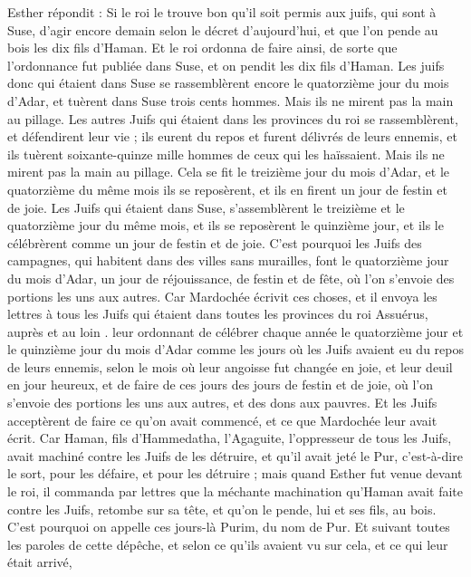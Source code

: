 \begin{multicols}{2}
Esther répondit : Si le roi le trouve bon qu'il soit permis aux juifs, qui sont à Suse, d’agir encore demain selon le décret d’aujourd'hui, et que l'on pende au bois les dix fils d'Haman.
Et le roi ordonna de faire ainsi, de sorte que l’ordonnance fut publiée dans Suse, et on pendit les dix fils d'Haman.
Les juifs donc qui étaient dans Suse se rassemblèrent encore le quatorzième jour du mois d'Adar, et tuèrent dans Suse trois cents hommes. Mais ils ne mirent pas la main au pillage.
Les autres Juifs qui étaient dans les provinces du roi se rassemblèrent, et défendirent leur vie ; ils eurent du repos et furent délivrés de leurs ennemis, et ils tuèrent soixante-quinze mille hommes de ceux qui les haïssaient. Mais ils ne mirent pas la main au pillage.
Cela se fit le treizième jour du mois d'Adar, et le quatorzième du même mois ils se reposèrent, et ils en firent un jour de festin et de joie.
Les Juifs qui étaient dans Suse, s'assemblèrent le treizième et le quatorzième jour du même mois, et ils se reposèrent le quinzième jour, et ils le célébrèrent comme un jour de festin et de joie.
C'est pourquoi les Juifs des campagnes, qui habitent dans des villes sans murailles, font le quatorzième jour du mois d'Adar, un jour de réjouissance, de festin et de fête, où l’on s’envoie des portions les uns aux autres.
Car Mardochée écrivit ces choses, et il envoya les lettres à tous les Juifs qui étaient dans toutes les provinces du roi Assuérus, auprès et au loin .
leur ordonnant de célébrer chaque année le quatorzième jour et le quinzième jour du mois d'Adar
comme les jours où les Juifs avaient eu du repos de leurs ennemis, selon le mois où leur angoisse fut changée en joie, et leur deuil en jour heureux, et de faire de ces jours des jours de festin et de joie, où l’on s’envoie des portions les uns aux autres, et des dons aux pauvres.
Et les Juifs acceptèrent de faire ce qu’on avait commencé, et ce que Mardochée leur avait écrit.
Car Haman, fils d'Hammedatha, l’Agaguite, l'oppresseur de tous les Juifs, avait machiné contre les Juifs de les détruire, et qu’il avait jeté le Pur, c’est-à-dire le sort, pour les défaire, et pour les détruire ;
mais quand Esther fut venue devant le roi, il commanda par lettres que la méchante machination qu’Haman avait faite contre les Juifs, retombe sur sa tête, et qu’on le pende, lui et ses fils, au bois.
C'est pourquoi on appelle ces jours-là Purim, du nom de Pur. Et suivant toutes les paroles de cette dépêche, et selon ce qu'ils avaient vu sur cela, et ce qui leur était arrivé,

\end{multicols}
